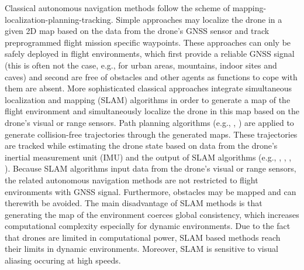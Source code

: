 Classical autonomous navigation methods 
follow the scheme of mapping-localization-planning-tracking.
Simple approaches may localize the drone
in a given 2D map based on the data from the drone's GNSS sensor
and track preprogrammed flight mission specific waypoints.
These approaches can only be safely deployed in flight environments,
which first provide a reliable GNSS signal 
(this is often not the case, e.g., for urban areas, mountains, indoor sites and caves)
and second are free of obstacles and other agents
as functions to cope with them are absent.
More sophisticated classical approaches integrate 
simultaneous localization and mapping (SLAM) algorithms
in order to generate a map of the flight environment
and simultaneously localize the drone in this map
based on the drone's visual or range sensors. \cite{MurArtal2015}
Path planning algorithms (e.g., \cite{Bircher2016}, \cite{Cieslewski2017})
are applied to generate collision-free trajectories through the generated maps.
These trajectories are tracked while estimating the drone state
based on data from the drone's inertial measurement unit (IMU)
and the output of SLAM algorithms 
(e.g., \cite{Lin2017}, \cite{Scaramuzza2014}, \cite{Sa2018}, \cite{Loianno2017}).
Because SLAM algorithms input data from the drone's visual or range sensors,
the related autonomous navigation methods are not restricted
to flight environments with GNSS signal.
Furthermore, obstacles may be mapped and can therewith be avoided.
The main disadvantage of SLAM methods is that 
generating the map of the environment coerces global consistency,
which increases computational complexity especially for dynamic environments.
Due to the fact that drones are limited in computational power,
SLAM based methods reach their limits in dynamic environments.
Moreover, SLAM is sensitive to visual aliasing occuring at high speeds.


